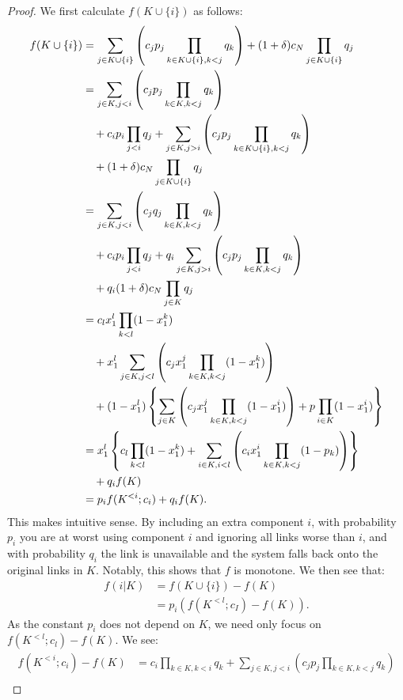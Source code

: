 \documentclass[11pt,authoryear,a4paper]{article}
\theoremstyle{definition}
\begin{document}
\begin{proof}
We first calculate $f(K\cup \{i\})$ as follows:
\begin{align*}
    f(K\cup\{i\}) &= \sum_{j\in K\cup\{i\}}\left( c_j p_j \prod_{k\in K\cup\{i\}, k<j}q_k\right) + (1+\delta)c_N\prod_{j\in K\cup\{i\}}q_j\\
    &= \sum_{j\in K, j < i}\left( c_j p_j \prod_{k\in K, k<j}q_k\right)\\
    &\quad+ c_ip_i\prod_{j < i}q_j
    + \sum_{j\in K, j > i}\left( c_j p_j \prod_{k\in K \cup \{i\}, k<j}q_k\right)\\
    &\quad+ (1+\delta)c_N \prod_{j\in K \cup \{i\}}q_j\\
    &= \sum_{j\in K, j < i}\left( c_j q_j \prod_{k\in K, k<j}q_k\right)\\
    &\quad+ c_ip_i\prod_{j < i}q_j
    + q_i\sum_{j\in K, j > i}\left( c_j p_j \prod_{k\in K, k<j}q_k\right)\\
    &\quad+ q_i(1+\delta)c_N \prod_{j\in K}q_j\\\vspace{1em}
    &= c_lx_1^l\prod_{k < l}(1 - x_1^k)\\
    &\quad+x_1^l\sum_{j\in K, j < l}\left( c_j x_1^j \prod_{k\in K, k<j}(1 - x_1^k)\right)\\
    &\quad+(1 - x_1^l)\left\{\sum_{j\in K}\left( c_j x_1^j \prod_{k\in K, k<j}(1 - x_1^i)\right) + p \prod_{i\in K}(1 - x_1^i)\right\}\\\vspace{1em}
    &= x_1^l\left\{c_l\prod_{k < l}(1 - x_1^k) + \sum_{i\in K, i < l}\left( c_i x_1^i \prod_{k\in K, k<j}(1 - p_k)\right)\right\}\\
    &\quad+ q_if(K)\\\vspace{1em}
    &= p_i f(K^{<i};c_i) + q_if(K).
\end{align*}
This makes intuitive sense. By including an extra component $i$, with probability $p_i$ you are at worst using component $i$ and ignoring all links worse than $i$, and with probability $q_i$ the link is unavailable and the system falls back onto the original links in $K$. Notably, this shows that $f$ is monotone. We then see that:
\begin{align*}
    f(i|K) &= f(K\cup\{i\}) - f(K)\\
    &= p_i\left(f(K^{<l};c_I) - f(K)\right).
\end{align*}
As the constant $p_i$ does not depend on $K$, we need only focus on $f(K^{<l};c_l) - f(K)$. We see:
\begin{align*}
    f(K^{<i};c_i) - f(K) &= c_i\prod_{k\in K, k < i}q_k + \sum_{j\in K, j < i}\left( c_j p_j \prod_{k\in K, k<j}q_k\right)\\

\end{align*}
\end{proof}
\end{document}
